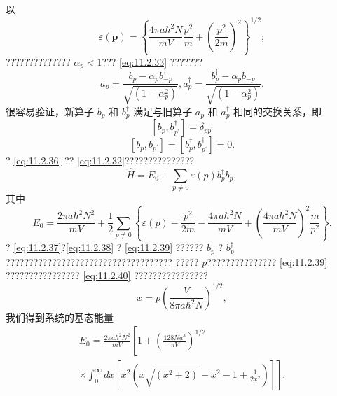 以
\begin{equation}\tag{11.2.35}\label{eq:11.2.35}
\varepsilon ( \pmb { p } ) = \left\{ \frac { 4 \pi a \hbar ^{2} N } { m V } \frac { p ^{2} } { m } + \left( \frac { p ^{2} } { 2 m } \right) ^{2} \right\} ^{1 / 2} ;
\end{equation}
?????????????? \(\alpha_{p} < 1\)??? \autoref{eq:11.2.33} ???????
\begin{equation}\tag{11.2.36}\label{eq:11.2.36}
a _ { p } = \frac { b _ { p } - \alpha _ { p } b _ { - p } ^{\dagger} } { \sqrt { ( 1 - \alpha _ { p } ^{2} ) } } ,  a _ { p } ^{\dagger} = \frac { b _ { p } ^{\dagger} - \alpha _ { p } b _ { - p } } { \sqrt { ( 1 - \alpha _ { p } ^{2} ) } } .
\end{equation}
很容易验证，新算子 \(b_{p}\) 和 \(b_{p}^{\dagger}\) 满足与旧算子 \(a_{p}\) 和 \(a_{p}^{\dagger}\) 相同的交换关系，即
\begin{equation}\tag{11.2.37}\label{eq:11.2.37}
[ b _ { p } , b _ { p ^{\prime} } ^{\dagger} ] = \delta _ { p p ^{\prime} }
\end{equation}
\begin{equation}\tag{11.2.38}\label{eq:11.2.38}
[ b _ { p } , b _ { p ^{\prime} } ] = [ b _ { p } ^{\dagger} , b _ { p ^{\prime} } ^{\dagger} ] = 0 .
\end{equation}
? \autoref{eq:11.2.36} ?? \autoref{eq:11.2.32}???????????????
\begin{equation}\tag{11.2.39}\label{eq:11.2.39}
\hat { H } = E _ { 0 } + \sum _ { p \neq 0 } \varepsilon ( p ) b _ { p } ^{\dagger} b _ { p } ,
\end{equation}
其中
\begin{equation}\tag{11.2.40}\label{eq:11.2.40}
E _ { 0 } = \frac { 2 \pi a \hbar ^{2} N ^{2} } { m V } + \frac { 1 } { 2 } \sum _ { p \neq 0 } \left\{ \varepsilon ( p ) - \frac { p ^{2} } { 2 m } - \frac { 4 \pi a \hbar ^{2} N } { m V } + \left( \frac { 4 \pi a \hbar ^{2} N } { m V } \right) ^{2} \frac { m } { p ^{2} } \right\} .
\end{equation}
? \autoref{eq:11.2.37}?\autoref{eq:11.2.38} ? \autoref{eq:11.2.39} ?????? \(b_{p}\) ? \(b_{p}^{\dagger}\) ????????????????????????????????????
????? \(p\)??????????????? \autoref{eq:11.2.39} ???????????????? \autoref{eq:11.2.40} ????????????????
\begin{equation}\tag{11.2.41}\label{eq:11.2.41}
x = p \left( \frac { V } { 8 \pi a \hbar ^{2} N } \right) ^{1 / 2} ,
\end{equation}
我们得到系统的基态能量
\begin{equation}\tag{11.2.42}\label{eq:11.2.42}
\begin{array}{r} { E _ { 0 } = \frac { 2 \pi a \hbar ^{2} N ^{2} } { m V } \left[ 1 + \left( \frac { 12 8 N a ^{3} } { \pi V } \right) ^{1 / 2} \right. } \\{ \left. \times \int _ { 0 } ^{\infty} d x \left[ x ^{2} \left( x \sqrt { ( x ^{2} + 2 ) } - x ^{2} - 1 + \frac { 1 } { 2 x ^{2} } \right) \right] \right] . } \end{array}
\end{equation}

